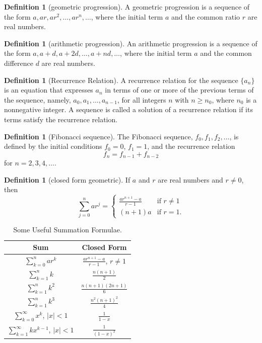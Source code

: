 \documentclass[letterpaper,10pt]{article}
\theoremstyle{plain}
\theoremstyle{definition}
\newtheorem{defn}[thm]{Definition}
\theoremstyle{remark}
\begin{document}
\begin{defn}[geometric progression]
A geometric progression is a sequence of the form $a, ar, ar^2, \ldots, ar^n, \ldots$, where the initial term $a$ and the common ratio $r$ are real numbers.
\end{defn}
\begin{defn}[arithmetic progression]
An arithmetic progression is a sequence of the form $a, a + d, a + 2d, \ldots, a + nd, \ldots$, where the initial term $a$ and the common difference $d$ are real numbers.

\end{defn}
\begin{defn}[Recurrence Relation]
A recurrence relation for the sequence $\{a_n\}$ is an equation that expresses $a_n$ in terms of one or more of the previous terms of the sequence, namely, $a_0, a_1, \ldots, a_{n-1}$, for all integers $n$ with $n \geq n_0$, where $n_0$ is a nonnegative integer. A sequence is called a solution of a recurrence relation if its terms satisfy the recurrence relation.
\end{defn}
\begin{defn}[Fibonacci sequence]
The Fibonacci sequence, $f_0, f_1, f_2, \ldots$, is defined by the initial conditions $f_0 = 0$, $f_1 = 1$, and the recurrence relation
\[f_n = f_{n-1} + f_{n-2}\]
for \(n = 2, 3, 4, \ldots\).
\end{defn}
\begin{defn}[closed form geometric]
If \(a\) and \(r\) are real numbers and \(r \neq 0\), then
\[
\sum_{j=0}^{n} ar^j =
\begin{cases}
    \frac{ar^{n+1} - a}{r - 1} & \text{if } r \neq 1 \\
    (n + 1)a & \text{if } r = 1.
\end{cases}
\]
\end{defn}


\begin{table}[h]
\centering
\caption{Some Useful Summation Formulae.}
\begin{tabular}{|c|c|}
\hline
Sum & Closed Form \\
\hline
$\displaystyle\sum_{k=0}^{n} ar^k$ & $\frac{ar^{n+1} - a}{r - 1}$, $r \neq 1$ \\
\hline
$\displaystyle\sum_{k=1}^{n} k$ & $\frac{n(n + 1)}{2}$ \\
\hline
$\displaystyle\sum_{k=1}^{n} k^2$ & $\frac{n(n + 1)(2n + 1)}{6}$ \\
\hline
$\displaystyle\sum_{k=1}^{n} k^3$ & $\frac{n^2(n + 1)^2}{4}$ \\
\hline
$\displaystyle\sum_{k=0}^{\infty} x^k$, $|x| < 1$ & $\frac{1}{1 - x}$ \\
\hline
$\displaystyle\sum_{k=1}^{\infty} kx^{k-1}$, $|x| < 1$ & $\frac{1}{(1 - x)^2}$ \\
\hline
\end{tabular}
\end{table}
\newpage
\end{document}
